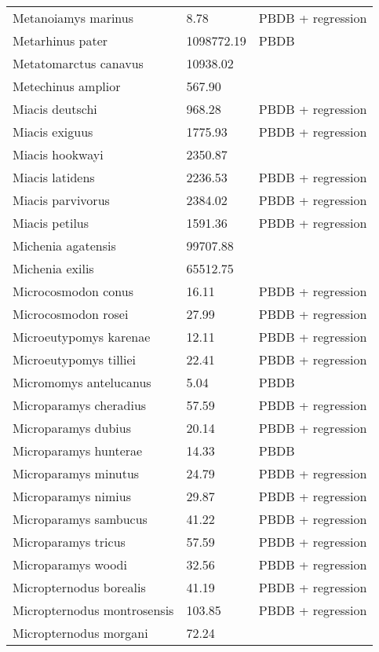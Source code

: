 \begin{center}
\begin{longtable}{p{} p{} p{} }
  Metanoiamys marinus & 8.78 & PBDB + regression \\ 
  Metarhinus pater & 1098772.19 & PBDB \\ 
  Metatomarctus canavus & 10938.02 & \cite{Tomiya2013} \\ 
  Metechinus amplior & 567.90 & \cite{Tedford1994} \\ 
  Miacis deutschi & 968.28 & PBDB + regression \\ 
  Miacis exiguus & 1775.93 & PBDB + regression \\ 
  Miacis hookwayi & 2350.87 & \cite{Patton1973} \\ 
  Miacis latidens & 2236.53 & PBDB + regression \\ 
  Miacis parvivorus & 2384.02 & PBDB + regression \\ 
  Miacis petilus & 1591.36 & PBDB + regression \\ 
  Michenia agatensis & 99707.88 & \cite{Tomiya2013} \\ 
  Michenia exilis & 65512.75 & \cite{Tomiya2013} \\ 
  Microcosmodon conus & 16.11 & PBDB + regression \\ 
  Microcosmodon rosei & 27.99 & PBDB + regression \\ 
  Microeutypomys karenae & 12.11 & PBDB + regression \\ 
  Microeutypomys tilliei & 22.41 & PBDB + regression \\ 
  Micromomys antelucanus & 5.04 & PBDB \\ 
  Microparamys cheradius & 57.59 & PBDB + regression \\ 
  Microparamys dubius & 20.14 & PBDB + regression \\ 
  Microparamys hunterae & 14.33 & PBDB \\ 
  Microparamys minutus & 24.79 & PBDB + regression \\ 
  Microparamys nimius & 29.87 & PBDB + regression \\ 
  Microparamys sambucus & 41.22 & PBDB + regression \\ 
  Microparamys tricus & 57.59 & PBDB + regression \\ 
  Microparamys woodi & 32.56 & PBDB + regression \\ 
  Micropternodus borealis & 41.19 & PBDB + regression \\ 
  Micropternodus montrosensis & 103.85 & PBDB + regression \\ 
  Micropternodus morgani & 72.24 & \cite{Tomiya2013} \\ 

\end{longtable}
\end{center}
